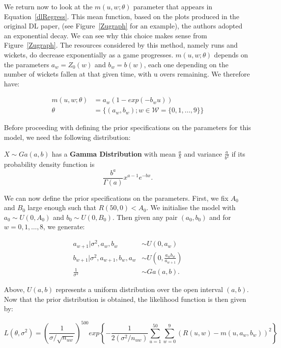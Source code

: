We return now to look at the $m(u,w;\theta)$ parameter that appears in Equation~\ref{dlRegress}. This mean function, based on the plots produced in the original DL
paper, (see Figure~\ref{Zugraph} for an example), the authors adopted an exponential decay. We can see why this choice makes sense from Figure~\ref{Zugraph}.
The resources considered by this method, namely runs and wickets, do decrease exponentially as a game progresses. $m(u,w;\theta)$ depends on the parameters
$a_w = Z_0(w)$ and $b_w = b(w)$, each one depending on the number of wickets fallen at that given time, with u overs remaining. We therefore have:

\begin{align}
    \label{mdef}
        m(u,w;\theta) &= a_w(1-exp(-b_wu)) \\
               \theta &= \{ (a_w,b_w); w \in \mathcal{W}=\{0,1,\ldots,9\} \} 
\end{align}

Before proceeding with defining the prior specifications on the parameters for this model, we need the following distribution:

\begin{definition}
    $X \sim Ga(a,b)$ has a \textbf{Gamma Distribution} with mean $\frac{a}{b}$ and variance $\frac{a}{b^2}$ if its probability density function is
    $$
        \frac{b^a}{\Gamma(a)} x^{a-1}e^{-bx}.  
    $$
\end{definition}

We can now define the prior specifications on the parameters. First, we fix $A_0$ and $B_0$ large enough such that $R(50,0) < A_0$. We initialise  the model with
$a_0 \sim U(0,A_0)$ and $b_0 \sim U(0,B_0)$. Then given any pair $(a_0,b_0)$ and for $w=0,1,\ldots,8$, we generate:

\begin{align}
    a_{w+1}|\sigma^2,a_w,b_w &\sim U(0,a_w) \\
    b_{w+1}|\sigma^2,a_{w+1},b_w,a_w &\sim U\left(0,\frac{a_wb_w}{a_{w+1}}\right) \\
    \frac{1}{\sigma^2} &\sim Ga(a,b).
\end{align}

Above, $U(a,b)$ represents a uniform distribution over the open interval $(a,b)$. Now that the prior distribution is obtained, the likelihood function is then 
given by:

\begin{equation}
    L(\theta,\sigma^2) = \left( \frac{1}{\sigma / \sqrt{n_{uw}}} \right)^{500} exp \left\{ - \frac{1}{2(\sigma^2 / n_{uw})} \sum_{u=1}^{50} \sum_{w=0}^9 (R(u,w)-m(u,a_w,b_w))^2  \right\}
\end{equation}

